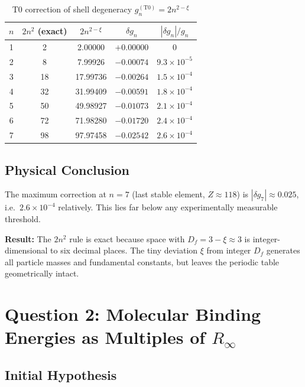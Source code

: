 \begin{table}[htbp]
\centering
\caption{T0 correction of shell degeneracy $g_n^{(\mathrm{T0})} = 2n^{2-\xi}$}
\label{tab:gn-correction}
\begin{tabular}{ccccc}
\hline
$n$ & $2n^2$ (exact) & $2n^{2-\xi}$ & $\delta g_n$ & $|\delta g_n|/g_n$ \\
\hline
1 &  2 & 2.00000 & $+0.00000$ & $0$ \\
2 &  8 & 7.99926 & $-0.00074$ & $9.3 \times 10^{-5}$ \\
3 & 18 & 17.99736& $-0.00264$ & $1.5 \times 10^{-4}$ \\
4 & 32 & 31.99409& $-0.00591$ & $1.8 \times 10^{-4}$ \\
5 & 50 & 49.98927& $-0.01073$ & $2.1 \times 10^{-4}$ \\
6 & 72 & 71.98280& $-0.01720$ & $2.4 \times 10^{-4}$ \\
7 & 98 & 97.97458& $-0.02542$ & $2.6 \times 10^{-4}$ \\
\hline
\end{tabular}
\end{table}

\subsection{Physical Conclusion}
\label{subsec:conclusion-gn}

The maximum correction at $n=7$ (last stable element, $Z \approx 118$)
is $|\delta g_7| \approx 0.025$, i.e.\ $2.6 \times 10^{-4}$ relatively.
This lies far below any experimentally measurable threshold.

\textbf{Result:} The $2n^2$ rule is exact because space with
$D_f = 3 - \xi \approx 3$ is integer-dimensional to six decimal places.
The tiny deviation $\xi$ from integer $D_f$ generates all
particle masses and fundamental constants, but leaves the periodic table
geometrically intact.

\section{Question 2: Molecular Binding Energies as Multiples of \texorpdfstring{$R_\infty$}{R\_inf}}
\label{sec:binding-energies}

\subsection{Initial Hypothesis}
\label{subsec:hypothesis-be}

